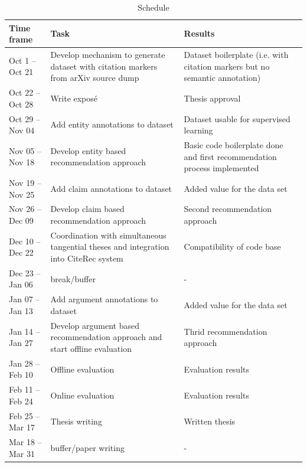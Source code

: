 \documentclass{proseminar}
\begin{document}
\begin{table}
\centering
\caption{Schedule}\label{schedule}
\hphantom{ }
\begin{tabular}{|p{2.5cm}|p{6cm}|p{4cm}|} \hline
Time frame&Task&Results\\ \hline
Oct 1 -- Oct 21 & Develop mechanism to generate dataset with citation markers from arXiv source dump & Dataset boilerplate (i.e. with citation markers but no semantic annotation)\\ \hline
Oct 22 -- Oct 28 & Write expos\'e  & Thesis approval\\ \hline
Oct 29 -- Nov 04 & Add entity annotations to dataset & Dataset usable for supervised learning\\ \hline
Nov 05 -- Nov 18 & Develop entity based recommendation approach & Basic code boilerplate done and first recommendation process implemented\\ \hline
Nov 19 -- Nov 25 & Add claim annotations to dataset & Added value for the data set\\ \hline
Nov 26 -- Dec 09 & Develop claim based recommendation approach & Second recommendation approach\\ \hline
Dec 10 -- Dec 22 & Coordination with simultaneous tangential theses and integration into CiteRec system & Compatibility of code base\\ \hline
Dec 23 -- Jan 06 & break/buffer & -\\ \hline
Jan 07 -- Jan 13 & Add argument annotations to dataset & Added value for the data set\\ \hline
Jan 14 -- Jan 27 & Develop argument based recommendation approach and start offline evaluation & Thrid recommendation approach\\ \hline
Jan 28 -- Feb 10 & Offline evaluation & Evaluation results\\ \hline
Feb 11 -- Feb 24 & Online evaluation & Evaluation results\\ \hline
Feb 25 -- Mar 17 & Thesis writing & Written thesis\\ \hline
Mar 18 -- Mar 31 & buffer/paper writing & -\\ \hline\end{tabular}
\end{table}
\end{document}
